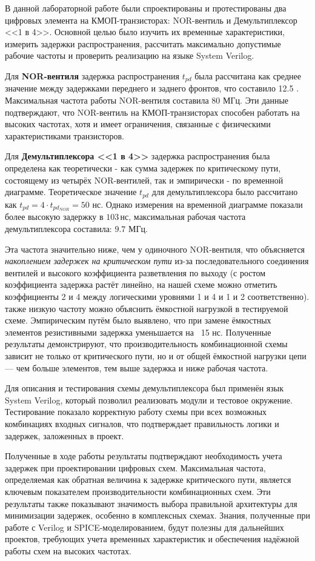 В данной лабораторной работе были спроектированы и протестированы два цифровых элемента на КМОП-транзисторах: NOR-вентиль и Демультиплексор <<1 в 4>>. Основной целью было изучить их временные характеристики, измерить задержки распространения, рассчитать максимально допустимые рабочие частоты и проверить реализацию на языке System Verilog.

Для \textbf{NOR-вентиля} задержка распространения \( t_{pd} \) была рассчитана как среднее значение между задержками переднего и заднего фронтов, что составило 12.5 .
Максимальная частота работы NOR-вентиля составила \( 80 \text{ МГц}. \)
Эти данные подтверждают, что NOR-вентиль на КМОП-транзисторах способен работать на высоких частотах, хотя и имеет ограничения, связанные с физическими характеристиками транзисторов.

Для \textbf{Демультиплексора <<1 в 4>>} задержка распространения была определена как теоретически - как сумма задержек по критическому пути, состоящему из четырёх NOR-вентилей, так и эмпирически - по временной диаграмме. Теоретическое значение \( t_{pd} \) для демультиплексора было рассчитано как \( t_{pd} = 4 \cdot t_{pd_{NOR}} = 50 \text{ нс} \). Однако измерения на временной диаграмме показали более высокую задержку в \(103 \, \text{нс}\), максимальная рабочая частота демультиплексора составила: \(9.7 \text{ МГц}.\)

Эта частота значительно ниже, чем у одиночного NOR-вентиля, что объясняется \textit{накоплением задержек на критическом пути} из-за последовательного соединения вентилей и высокого коэффициента разветвления по выходу (с ростом коэффициента задержка растёт линейно, на нашей схеме можно отметить коэффициенты 2 и 4 между логическими уровнями 1 и 4 и 1 и 2 соответственно). также низкую частоту можно объяснить ёмкостной нагрузкой в тестируемой схеме. Эмпирическим путём было выявлено, что при замене ёмкостных элементов резистивными задержка уменьшается на ~15 нс. Полученные результаты демонстрируют, что производительность комбинационной схемы зависит не только от критического пути, но и от общей ёмкостной нагрузки цепи — чем больше элементов, тем выше задержка и ниже рабочая частота.

Для описания и тестирования схемы демультиплексора был применён язык System Verilog, который позволил реализовать модули и тестовое окружение. Тестирование показало корректную работу схемы при всех возможных комбинациях входных сигналов, что подтверждает правильность логики и задержек, заложенных в проект.

Полученные в ходе работы результаты подтверждают необходимость учета задержек при проектировании цифровых схем. Максимальная частота, определяемая как обратная величина к задержке критического пути, является ключевым показателем производительности комбинационных схем. Эти результаты также показывают значимость выбора правильной архитектуры для минимизации задержек, особенно в комплексных схемах. Знания, полученные при работе с Verilog и SPICE-моделированием, будут полезны для дальнейших проектов, требующих учета временных характеристик и обеспечения надёжной работы схем на высоких частотах.
